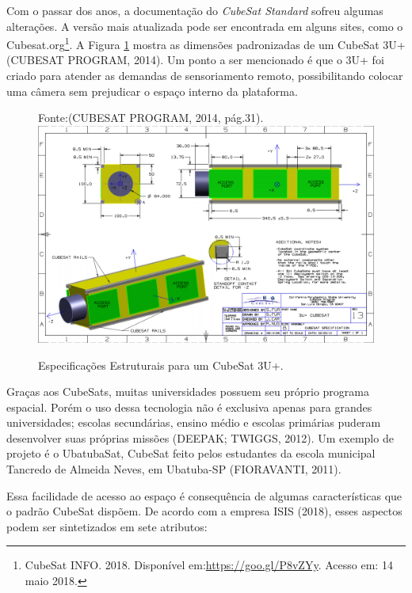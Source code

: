 Com o passar dos anos, a documentação do \textit{CubeSat Standard} sofreu algumas alterações. A versão mais atualizada pode ser encontrada em alguns sites, como o Cubesat.org\footnote{CubeSat INFO. 2018. Disponível em:\url{https://goo.gl/P8vZYy}. Acesso em: 14 maio 2018.}. A Figura \ref{fig05} mostra as dimensões padronizadas de um CubeSat 3U+ (CUBESAT PROGRAM, 2014). Um ponto a ser mencionado é que o 3U+ foi criado para atender as demandas de sensoriamento remoto, possibilitando colocar uma câmera sem prejudicar o espaço interno da plataforma.

\begin{figure}[h]
	\centering
    Fonte:(CUBESAT PROGRAM, 2014, pág.31).
	\includegraphics[keepaspectratio=true,scale=0.55]{figuras/cubesat3u+.PNG}
	\caption{Especificações Estruturais para um CubeSat 3U+.}
	\label{fig05}
\end{figure}

Graças aos CubeSats, muitas universidades possuem seu próprio programa espacial. Porém o uso dessa tecnologia não é exclusiva apenas para grandes universidades; escolas secundárias, ensino médio e escolas primárias puderam desenvolver suas próprias missões (DEEPAK; TWIGGS, 2012). Um exemplo de projeto é o UbatubaSat, CubeSat feito pelos estudantes da escola municipal Tancredo de Almeida Neves, em Ubatuba-SP (FIORAVANTI, 2011).

Essa facilidade de acesso ao espaço é consequência de algumas características que o padrão CubeSat dispõem. De acordo com a empresa ISIS (2018), esses aspectos podem ser sintetizados em sete atributos:


